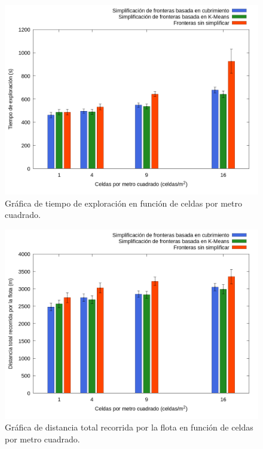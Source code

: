 \begin{figure}[H]
  \centerfloat

  \includegraphics[clip=true, width=\graphlen]{imagenes/graficas_chicas/graficas_histo_num/ident_obj/exploration_time.png}

  \caption{Gráfica de tiempo de exploración en función de celdas por metro cuadrado.}\label{fig:gra:idobj:et}

\end{figure}

\begin{figure}[H]
  \centerfloat

  \includegraphics[clip=true, width=\graphlen]{imagenes/graficas_chicas/graficas_histo_num/ident_obj/exploration_cost.png}

  \caption{Gráfica de distancia total recorrida por la flota en función de celdas por metro cuadrado.}\label{fig:gra:idobj:ec}

\end{figure}

